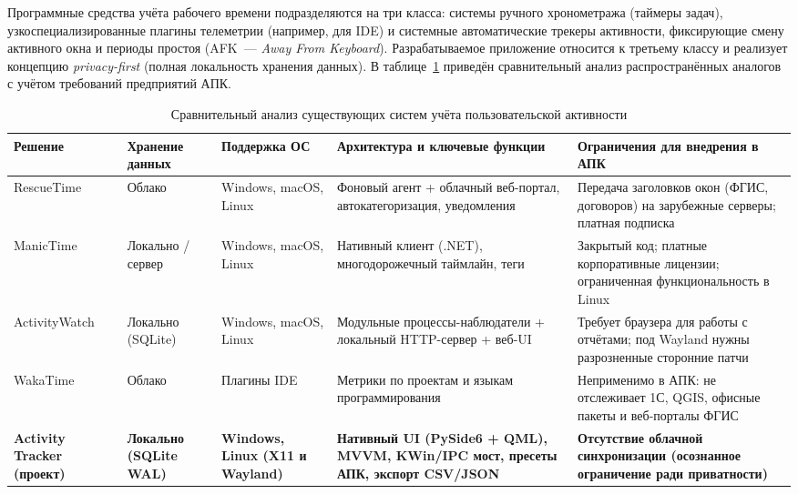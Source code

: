 \documentclass{timcw}
\begin{document}
Программные средства учёта рабочего времени подразделяются на три класса: системы ручного хронометража (таймеры задач), узкоспециализированные плагины телеметрии (например, для IDE) и системные автоматические трекеры активности, фиксирующие смену активного окна и периоды простоя (AFK~--- \emph{Away From Keyboard}). Разрабатываемое приложение относится к третьему классу и реализует концепцию \emph{privacy-first} (полная локальность хранения данных). В таблице~\ref{tab:analogues} приведён сравнительный анализ распространённых аналогов с учётом требований предприятий АПК.

\begin{table}[H]
\centering
\caption{Сравнительный анализ существующих систем учёта пользовательской активности}
\label{tab:analogues}
\footnotesize
\begin{tabularx}{\textwidth}{>{\raggedright\arraybackslash}p{2.5cm} >{\centering\arraybackslash}p{1.9cm} >{\centering\arraybackslash}p{2.3cm} >{\raggedright\arraybackslash}X >{\raggedright\arraybackslash}X}
\toprule
\textbf{Решение} & \textbf{Хранение данных} & \textbf{Поддержка ОС} & \textbf{Архитектура и ключевые функции} & \textbf{Ограничения для внедрения в АПК} \\
\midrule
RescueTime \cite{rescuetime} & Облако & Windows, macOS, Linux & Фоновый агент + облачный веб-портал, автокатегоризация, уведомления & Передача заголовков окон (ФГИС, договоров) на зарубежные серверы; платная подписка \\
\addlinespace
ManicTime \cite{manictime} & Локально / сервер & Windows, macOS, Linux & Нативный клиент (.NET), многодорожечный таймлайн, теги & Закрытый код; платные корпоративные лицензии; ограниченная функциональность в Linux \\
\addlinespace
ActivityWatch \cite{activitywatch} & Локально (SQLite) & Windows, macOS, Linux & Модульные процессы-наблюдатели + локальный HTTP-сервер + веб-UI & Требует браузера для работы с отчётами; под Wayland нужны разрозненные сторонние патчи \\
\addlinespace
WakaTime \cite{wakatime} & Облако & Плагины IDE & Метрики по проектам и языкам программирования & Неприменимо в АПК: не отслеживает 1С, QGIS, офисные пакеты и веб-порталы ФГИС \\
\addlinespace
\textbf{Activity Tracker (проект)} & \textbf{Локально (SQLite WAL)} & \textbf{Windows, Linux (X11 и Wayland)} & \textbf{Нативный UI (PySide6 + QML), MVVM, KWin/IPC мост, пресеты АПК, экспорт CSV/JSON} & \textbf{Отсутствие облачной синхронизации (осознанное ограничение ради приватности)} \\
\bottomrule
\end{tabularx}
\end{table}
\end{document}
